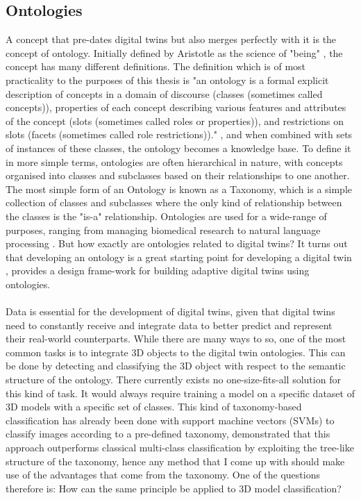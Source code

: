 \documentclass[a4paper,11pt,oneside]{article}
\begin{document}
  \subsection{Ontologies}
  A concept that pre-dates digital twins but also merges perfectly with it is the concept of ontology. Initially defined by Aristotle as the science of "being" \cite{inbook}, the concept has many different definitions. The definition which is of most practicality to the purposes of this thesis is "an ontology is a formal explicit description of concepts in a domain of discourse (classes (sometimes called concepts)), properties of each concept describing various features and attributes of the concept (slots (sometimes called roles or properties)), and restrictions on slots (facets (sometimes called role restrictions))." \cite{whatontology}, and when combined with sets of instances of these classes, the ontology becomes a knowledge base. To define it in more simple terms, ontologies are often hierarchical in nature, with concepts organised into classes and subclasses based on their relationships to one another. The most simple form of an Ontology is known as a Taxonomy, which is a simple collection of classes and subclasses where the only kind of relationship between the classes is the "is-a" relationship. Ontologies are used for a wide-range of purposes, ranging from managing biomedical research \cite{biomed} to natural language processing \cite{nlp}. But how exactly are ontologies related to digital twins? It turns out that developing an ontology is a great starting point for developing a digital twin \cite{azure}, \cite{machines10100861} provides a design frame-work for building adaptive digital twins using ontologies. \\ \\
  Data is essential for the development of digital twins, given that digital twins need to constantly receive and integrate data to better predict and represent their real-world counterparts. While there are many ways to so, one of the most common tasks is to integrate 3D objects to the digital twin ontologies. This can be done by detecting and classifying the 3D object with respect to the semantic structure of the ontology. There currently exists no one-size-fits-all solution for this kind of task. It would always require training a model on a specific dataset of 3D models with a specific set of classes. This kind of taxonomy-based classification has already been done with support machine vectors (SVMs) to classify images according to a pre-defined taxonomy, \cite{10.1007/978-3-642-12297-2_34} demonstrated that this approach outperforms classical multi-class classification by exploiting the tree-like structure of the taxonomy, hence any method that I come up with should make use of the advantages that come from the taxonomy. One of the questions therefore is: How can the same principle be applied to 3D model classification?
\end{document}
